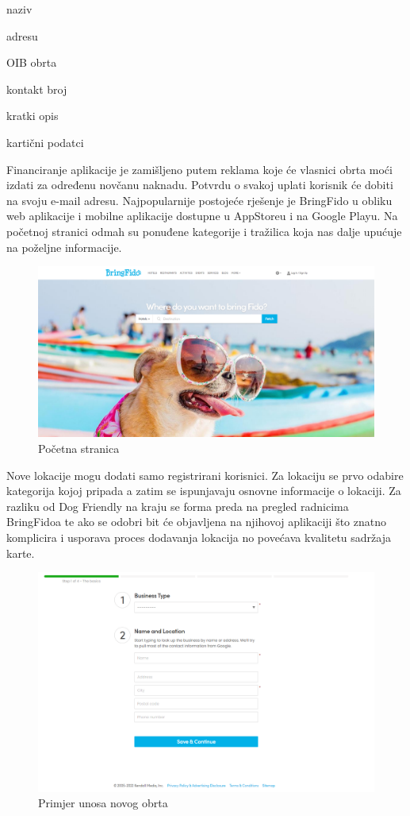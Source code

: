 \begin{packed_item}
	
	\item  naziv
	\item  adresu
	\item  OIB obrta
	\item  kontakt broj
	\item  kratki opis
	\item  kartični podatci
\end{packed_item} Financiranje aplikacije je zamišljeno putem reklama koje će vlasnici obrta moći izdati za određenu novčanu naknadu. Potvrdu o svakoj uplati korisnik će dobiti na svoju e-mail adresu.
\newline  Najpopularnije postojeće rješenje je BringFido u obliku web aplikacije i mobilne aplikacije dostupne u AppStoreu i na Google Playu. Na početnoj stranici odmah su ponuđene kategorije i tražilica koja nas dalje upućuje na poželjne informacije.
\begin{figure}[H]
	\includegraphics[scale=0.3]{slike/FidoHome.png} 
	\centering
	\caption{Početna stranica}
	\label{fig:promjene}
\end{figure}
Nove lokacije mogu dodati samo registrirani korisnici. Za lokaciju se prvo odabire kategorija kojoj pripada a zatim se ispunjavaju osnovne informacije o lokaciji. Za razliku od Dog Friendly na kraju se forma preda na pregled radnicima BringFidoa te ako se odobri bit će objavljena na njihovoj aplikaciji što znatno komplicira i usporava proces dodavanja lokacija no povećava kvalitetu sadržaja karte.
\begin{figure}[H]
	\includegraphics[scale=0.4]{slike/BringFidoBusiness.png} 
	\centering
	\caption{Primjer unosa novog obrta}
	\label{fig:promjene}
\end{figure}
